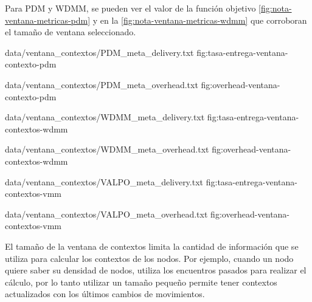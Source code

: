 Para PDM y WDMM, se pueden ver el valor de la función objetivo
\ref{fig:nota-ventana-metricas-pdm} y en la \ref{fig:nota-ventana-metricas-wdmm}
que corroboran el tamaño de ventana seleccionado.





\newpage
{}





{
{data/ventana_contextos/PDM_meta_delivery.txt}
}{fig:tasa-entrega-ventana-contexto-pdm}


{
{data/ventana_contextos/PDM_meta_overhead.txt}
}{fig:overhead-ventana-contexto-pdm}


{
{data/ventana_contextos/WDMM_meta_delivery.txt}
}{fig:tasa-entrega-ventana-contextos-wdmm}

{
{data/ventana_contextos/WDMM_meta_overhead.txt}
}{fig:overhead-ventana-contextos-wdmm}


{
{data/ventana_contextos/VALPO_meta_delivery.txt}
}{fig:tasa-entrega-ventana-contextos-vmm}

{
{data/ventana_contextos/VALPO_meta_overhead.txt}
}{fig:overhead-ventana-contextos-vmm}




El tamaño de la ventana de contextos limita la cantidad de información que se
utiliza para calcular los contextos de los nodos. Por ejemplo, cuando un nodo
quiere saber su densidad de nodos, utiliza los encuentros pasados para realizar
el cálculo, por lo tanto utilizar un tamaño pequeño permite tener contextos
actualizados con los últimos cambios de movimientos.


